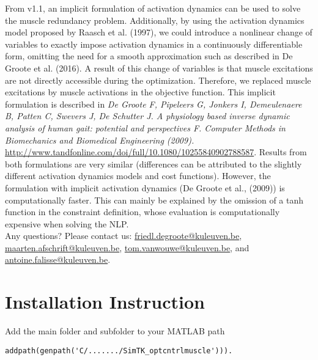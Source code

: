 \documentclass[a4paper,oneside,11pt]{article}
\begin{document}
From v1.1, an implicit formulation of activation dynamics can be used to solve the muscle redundancy problem. Additionally, by using the activation dynamics model proposed by Raasch et al. (1997), we could introduce a nonlinear change of variables to exactly impose activation dynamics in a continuously differentiable form, omitting the need for a smooth approximation such as described in De Groote et al. (2016). A result of this change of variables is that muscle excitations are not directly accessible during the optimization. Therefore, we replaced muscle excitations by muscle activations in the objective function. This implicit formulation is described in \textit{De Groote F, Pipeleers G, Jonkers I, Demeulenaere B, Patten C, Swevers J, De Schutter J. A physiology based inverse dynamic analysis of human gait: potential and perspectives F. Computer Methods in Biomechanics and Biomedical Engineering (2009).} \url{http://www.tandfonline.com/doi/full/10.1080/10255840902788587}. Results from both formulations are very similar (differences can be attributed to the slightly different activation dynamics models and cost functions). However, the formulation with implicit activation dynamics (De Groote et al., (2009)) is computationally faster. This can mainly be explained by the omission of a tanh function in the constraint definition, whose evaluation is computationally expensive when solving the NLP. \\

Any questions? Please contact us: \href{friedl.degroote@kuleuven.be}{friedl.degroote@kuleuven.be}, \href{maarten.afschrift@kuleuven.be}{maarten.afschrift@kuleuven.be}, \href{tom.vanwouwe@kuleuven.be}{tom.vanwouwe@kuleuven.be}, and \href{antoine.falisse@kuleuven.be}{antoine.falisse@kuleuven.be}.



\section{Installation Instruction}

Add the main folder and subfolder to your MATLAB path 
\begin{lstlisting}
addpath(genpath('C/......./SimTK_optcntrlmuscle'))).
\end{lstlisting}
\end{document}
